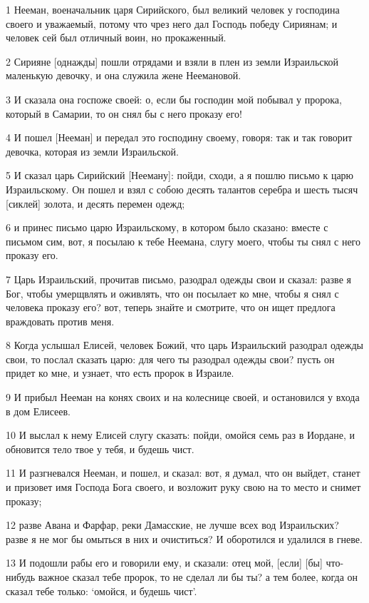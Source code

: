 \par 1 Нееман, военачальник царя Сирийского, был великий человек у господина своего и уважаемый, потому что чрез него дал Господь победу Сириянам; и человек сей был отличный воин, но прокаженный.
\par 2 Сирияне [однажды] пошли отрядами и взяли в плен из земли Израильской маленькую девочку, и она служила жене Неемановой.
\par 3 И сказала она госпоже своей: о, если бы господин мой побывал у пророка, который в Самарии, то он снял бы с него проказу его!
\par 4 И пошел [Нееман] и передал это господину своему, говоря: так и так говорит девочка, которая из земли Израильской.
\par 5 И сказал царь Сирийский [Нееману]: пойди, сходи, а я пошлю письмо к царю Израильскому. Он пошел и взял с собою десять талантов серебра и шесть тысяч [сиклей] золота, и десять перемен одежд;
\par 6 и принес письмо царю Израильскому, в котором было сказано: вместе с письмом сим, вот, я посылаю к тебе Неемана, слугу моего, чтобы ты снял с него проказу его.
\par 7 Царь Израильский, прочитав письмо, разодрал одежды свои и сказал: разве я Бог, чтобы умерщвлять и оживлять, что он посылает ко мне, чтобы я снял с человека проказу его? вот, теперь знайте и смотрите, что он ищет предлога враждовать против меня.
\par 8 Когда услышал Елисей, человек Божий, что царь Израильский разодрал одежды свои, то послал сказать царю: для чего ты разодрал одежды свои? пусть он придет ко мне, и узнает, что есть пророк в Израиле.
\par 9 И прибыл Нееман на конях своих и на колеснице своей, и остановился у входа в дом Елисеев.
\par 10 И выслал к нему Елисей слугу сказать: пойди, омойся семь раз в Иордане, и обновится тело твое у тебя, и будешь чист.
\par 11 И разгневался Нееман, и пошел, и сказал: вот, я думал, что он выйдет, станет и призовет имя Господа Бога своего, и возложит руку свою на то место и снимет проказу;
\par 12 разве Авана и Фарфар, реки Дамасские, не лучше всех вод Израильских? разве я не мог бы омыться в них и очиститься? И оборотился и удалился в гневе.
\par 13 И подошли рабы его и говорили ему, и сказали: отец мой, [если] [бы] что-нибудь важное сказал тебе пророк, то не сделал ли бы ты? а тем более, когда он сказал тебе только: `омойся, и будешь чист'.
